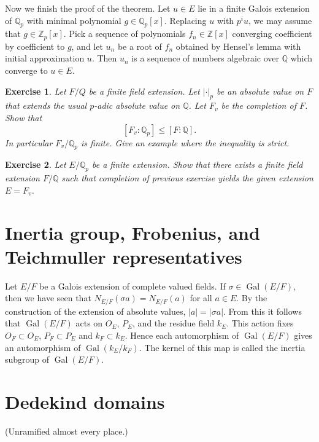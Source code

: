 \documentclass{amsart}
\def\op#1{{\operatorname{#1}}}
\newcommand{\ring}[1]{\mathbb{#1}}
\newtheorem{exercise}{Exercise}
\def\abs#1{{|#1|}}
\begin{document}
Now we finish the proof of the theorem.  Let $u\in E$ lie in a finite Galois
extension of $\ring{Q}_p$ with minimal polynomial $g\in \ring{Q}_p[x]$.  Replacing
$u$ with $p^i u$, we may assume that $g\in \ring{Z}_p[x]$.  Pick a sequence
of polynomials $f_n\in\ring{Z}[x]$ converging coefficient by coefficient to 
$g$, and let $u_n$ be a root of $f_n$ obtained by Hensel's lemma with initial
approximation $u$.  Then $u_n$ is a sequence of numbers algebraic over $\ring{Q}$
which converge to $u\in E$.


\begin{exercise}  Let $F/Q$ be a finite field extension.  Let $\abs{\cdot}_p$ be
an absolute value on $F$ that extends the usual $p$-adic absolute value
on $\ring{Q}$.  Let $F_v$ be the completion of $F$.  Show that
\[
[F_v:\ring{Q}_p]\le [F:\ring{Q}].
\]
In particular $F_v/\ring{Q}_p$ is finite.  Give an example where the inequality
is strict.
\end{exercise}

\begin{exercise}  Let $E/\ring{Q}_p$ be a finite extension.  Show that there
exists a finite field extension $F/\ring{Q}$ such that completion of previous
exercise yields the given extension $E=F_v$.
\end{exercise}


\newpage
\section{Inertia group, Frobenius, and Teichmuller representatives}

Let $E/F$ be a Galois extension of complete valued fields.
If $\sigma\in\op{Gal}(E/F)$, then we have seen that $N_{E/F}(\sigma a) = N_{E/F}(a)$
for all $a\in E$.  By the construction of the extension of absolute values,
$\abs{a}=\abs{\sigma{a}}$.  From this it follows that $\op{Gal}(E/F)$
acts on $O_E$, $P_E$, and the residue field $k_E$.
This action fixes $O_F\subset O_E$, $P_F\subset P_E$ and $k_F\subset k_E$.
Hence each automorphism of $\op{Gal}(E/F)$ gives an automorphism of 
$\op{Gal}(k_E/k_F)$.  The kernel of this map is called the inertia subgroup of
$\op{Gal}(E/F)$.

\newpage

\section{Dedekind domains}



(Unramified almost every place.)
\end{document}
